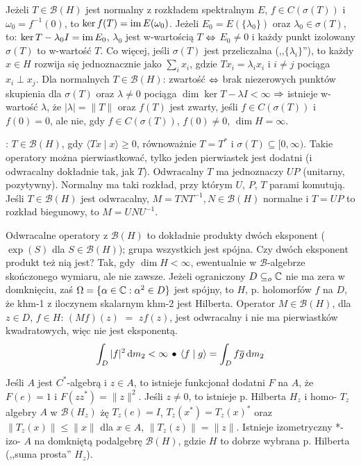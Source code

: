 Jeżeli  $T \in \mathcal B(H)$ jest normalny z rozkładem spektralnym $E$, $f \in C(\sigma(T))$ i $\omega_0 = f^{-1}(0)$, to $\ker f(T) = \operatorname{im} E(\omega_0)$.
Jeżeli $E_0 = E(\{\lambda_0\})$ oraz $\lambda_0 \in \sigma(T)$, to: $\ker T - \lambda_0 I = \operatorname{im} E_0$, $\lambda_0$ jest w-wartością $T$ $\Leftrightarrow$ $E_0 \neq 0$ i każdy punkt izolowany $\sigma(T)$ to w-wartość $T$.
Co więcej, jeśli $\sigma(T)$ jest przeliczalna (,,$\{\lambda_i\}$''), to każdy $x \in H$ rozwija się jednoznacznie jako $\sum_i x_i$, gdzie $Tx _i  = \lambda_i x_i$ i $i \neq j$ pociąga $x_i \perp x_j$.
Dla normalnych $T \in \mathcal B(H)$: zwartość $\Leftrightarrow$ brak niezerowych punktów skupienia dla $\sigma(T)$ oraz $\lambda \neq 0$ pociąga $\dim \ker T - \lambda I < \infty$ $\Rightarrow$ istnieje w-wartość $\lambda$, że $|\lambda| = \|T\|$ oraz $f(T)$ jest zwarty, jeśli $f \in C(\sigma(T))$ i $f(0) = 0$, ale nie, gdy $f \in C(\sigma(T))$, $f(0) \neq 0$, $\dim H = \infty$.

:  $T \in \mathcal B(H)$, gdy $\langle Tx \mid x \rangle \ge 0$, równoważnie $T=T^*$ i $\sigma(T) \subseteq [0, \infty)$.
Takie operatory można pierwiastkować, tylko jeden pierwiastek jest dodatni (i odwracalny dokładnie tak, jak $T$).
Odwracalny $T$ ma jednoznaczy  $UP$ (unitarny, pozytywny).
Normalny ma taki rozkład, przy którym $U$, $P$, $T$ parami komutują.
Jeśli $T \in \mathcal B(H)$ jest odwracalny, $M = TNT^{-1}, N \in \mathcal B(H)$ normalne i $T = UP$ to rozkład biegunowy, to $M = UNU^{-1}$.

Odwracalne  operatory z $\mathcal B(H)$ to dokładnie produkty dwóch eksponent ($\exp(S)$ dla $S \in \mathcal B(H)$); grupa wszystkich jest spójna.
Czy dwóch eksponent produkt też nią jest? 
Tak, gdy $\dim H < \infty$, ewentualnie w $\mathscr B$-algebrze skończonego wymiaru, ale nie zawsze.
Jeżeli ograniczony $D \subseteq_o \mathbb{C}$ nie ma zera w domknięciu, zaś $\Omega = \{\alpha \in \mathbb{C} : \alpha^2 \in D\}$ jest spójny, to $H$, p. holomorfów $f$ na $D$, że khm-1 z iloczynem skalarnym khm-2 jest Hilberta.
Operator $M \in \mathcal B(H)$, dla $z \in D$, $f \in H$: $(Mf)(z)$ $=$ $z f(z)$, jest odwracalny i nie ma pierwiastków kwadratowych, więc nie jest eksponentą.
\[
	\int_D |f|^2 \,\textrm{d}m_2 < \infty \, \bullet \,
	\langle f \mid g \rangle = \int_D f \overline{g} \,\textrm{d} m_2
\]

Jeśli  $A$ jest $C^*$-algebrą i $z \in A$, to istnieje funkcjonał dodatni $F$ na $A$, że $F(e) = 1$ i $F(zz^*) = \|z\|^2$.
Jeśli $z \neq 0$, to istnieje p. Hilberta $H_z$ i homo- $T_z$ algebry $A$ w $\mathcal B(H_z)$ żę $T_z(e) = I$, $T_z(x^*) = T_z(x)^*$ oraz $\|T_z(x) \| \le \|x\|$ dla $x \in A$, $\|T_z(z)\| = \|z\|$.
Istnieje izometryczny *-izo- $A$ na domkniętą podalgebrę $\mathcal B(H)$, gdzie $H$ to dobrze wybrana p. Hilberta (,,suma prosta'' $H_z$).

